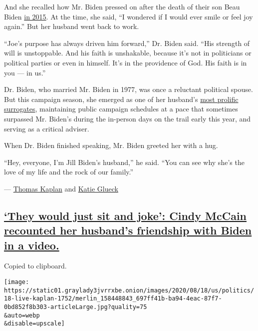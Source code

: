 And she recalled how Mr. Biden pressed on after the death of their son
Beau Biden
\href{https://www.nytimes3xbfgragh.onion/2015/05/31/us/politics/joseph-r-biden-iii-vice-presidents-son-beau-dies-at-46.html}{in
2015}. At the time, she said, ``I wondered if I would ever smile or feel
joy again.'' But her husband went back to work.

``Joe's purpose has always driven him forward,'' Dr. Biden said. ``His
strength of will is unstoppable. And his faith is unshakable, because
it's not in politicians or political parties or even in himself. It's in
the providence of God. His faith is in you --- in us.''

Dr. Biden, who married Mr. Biden in 1977, was once a reluctant political
spouse. But this campaign season, she emerged as one of her husband's
\href{https://www.nytimes3xbfgragh.onion/2020/02/01/us/politics/joe-jill-biden-2020.html}{most
prolific surrogates}, maintaining public campaign schedules at a pace
that sometimes surpassed Mr. Biden's during the in-person days on the
trail early this year, and serving as a critical adviser.

When Dr. Biden finished speaking, Mr. Biden greeted her with a hug.

``Hey, everyone, I'm Jill Biden's husband,'' he said. ``You can see why
she's the love of my life and the rock of our family.''

--- \href{https://www.nytimes3xbfgragh.onion/by/thomas-kaplan}{Thomas
Kaplan} and
\href{https://www.nytimes3xbfgragh.onion/by/katie-glueck}{Katie Glueck}

\hypertarget{they-would-just-sit-and-joke-cindy-mccain-recounted-her-husbands-friendship-with-biden-in-a-video}{%
\subsection{\texorpdfstring{\protect\hyperlink{they-would-just-sit-and-joke-cindy-mccain-recounted-her-husbands-friendship-with-biden-in-a-video}{`They
would just sit and joke': Cindy McCain recounted her husband's
friendship with Biden in a
video.}}{`They would just sit and joke': Cindy McCain recounted her husband's friendship with Biden in a video.}}\label{they-would-just-sit-and-joke-cindy-mccain-recounted-her-husbands-friendship-with-biden-in-a-video}}

Copied to clipboard.

\texttt{[image: https://static01.graylady3jvrrxbe.onion/images/2020/08/18/us/politics/18-live-kaplan-1752/merlin\_158448843\_697ff41b-ba94-4eac-87f7-0bd852f8b303-articleLarge.jpg?quality=75\\\&auto=webp\\\&disable=upscale]}

